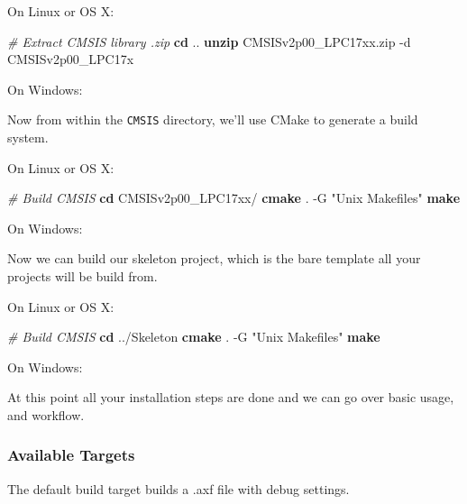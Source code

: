 \documentclass[]{article}
\newenvironment{Shaded}{\begin{snugshade}}{\end{snugshade}}
\newcommand{\KeywordTok}[1]{\textcolor[rgb]{0.13,0.29,0.53}{\textbf{{#1}}}}
\newcommand{\StringTok}[1]{\textcolor[rgb]{0.31,0.60,0.02}{{#1}}}
\newcommand{\CommentTok}[1]{\textcolor[rgb]{0.56,0.35,0.01}{\textit{{#1}}}}
\newcommand{\NormalTok}[1]{{#1}}
\begin{document}
On Linux or OS X:

\begin{Shaded}
\begin{Highlighting}[]
    \CommentTok{# Extract CMSIS library .zip}
    \KeywordTok{cd} \NormalTok{..}
    \KeywordTok{unzip} \NormalTok{CMSISv2p00_LPC17xx.zip -d CMSISv2p00_LPC17x}
\end{Highlighting}
\end{Shaded}

On Windows:


Now from within the \texttt{CMSIS} directory, we'll use CMake to
generate a build system.

On Linux or OS X:

\begin{Shaded}
\begin{Highlighting}[]
    \CommentTok{# Build CMSIS}
    \KeywordTok{cd} \NormalTok{CMSISv2p00_LPC17xx/}
    \KeywordTok{cmake} \NormalTok{. -G }\StringTok{"Unix Makefiles"}
    \KeywordTok{make}
\end{Highlighting}
\end{Shaded}

On Windows:


Now we can build our skeleton project, which is the bare template all
your projects will be build from.

On Linux or OS X:

\begin{Shaded}
\begin{Highlighting}[]
    \CommentTok{# Build CMSIS}
    \KeywordTok{cd} \NormalTok{../Skeleton}
    \KeywordTok{cmake} \NormalTok{. -G }\StringTok{"Unix Makefiles"}
    \KeywordTok{make}
\end{Highlighting}
\end{Shaded}

On Windows:


At this point all your installation steps are done and we can go over
basic usage, and workflow.

\subsubsection{Available Targets}

The default build target builds a .axf file with debug settings.
\end{document}
